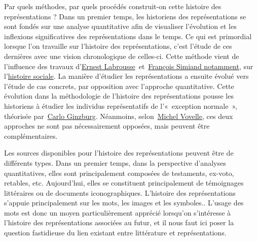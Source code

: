 \documentclass[letterpaper,portrait,12pt]{article}
\begin{document}
\textcolor[rgb]{0.000,0.000,0.000}{	Par quels m\'{e}thodes, par quels proc\'{e}d\'{e}s construit-on cette histoire des repr\'{e}sentations ? Dans un premier temps, les historiens des repr\'{e}sentations se sont fond\'{e}s sur une analyse quantitative afin de visualiser l'\'{e}volution et les inflexions significatives des repr\'{e}sentations dans le temps. Ce qui est primordial lorsque l'on travaille sur l'histoire des repr\'{e}sentations, c'est l'\'{e}tude de ces derni\`{e}res avec une vision chronologique de celles-ci. Cette m\'{e}thode vient de l'influence des travaux d'}\href{https://fr.wikipedia.org/wiki/Ernest_Labrousse}{\textcolor[rgb]{0.000,0.000,0.000}{Ernest Labrousse}}\textcolor[rgb]{0.000,0.000,0.000}{ et }\href{https://fr.wikipedia.org/wiki/François_Simiand}{\textcolor[rgb]{0.000,0.000,0.000}{Fran\c{c}ois Simiand notamment}}\textcolor[rgb]{0.000,0.000,0.000}{, sur l'}\href{https://fr.wikipedia.org/wiki/Histoire_sociale}{\textcolor[rgb]{0.000,0.000,0.000}{histoire sociale}}\textcolor[rgb]{0.000,0.000,0.000}{. La mani\`{e}re d'\'{e}tudier les repr\'{e}sentations a ensuite \'{e}volu\'{e} vers l'\'{e}tude de cas concrets, par opposition avec l'approche quantitative. Cette \'{e}volution dans la m\'{e}thodologie de l'histoire des repr\'{e}sentations pousse les historiens \`{a} \'{e}tudier les individus repr\'{e}sentatifs de l'« exception normale », th\'{e}oris\'{e}e par }\href{https://fr.wikipedia.org/wiki/Carlo_Ginzburg}{\textcolor[rgb]{0.000,0.000,0.000}{Carlo Ginzburg}}\textcolor[rgb]{0.000,0.000,0.000}{. N\'{e}anmoins, selon }\href{https://fr.wikipedia.org/wiki/Michel_Vovelle}{Michel }\href{https://fr.wikipedia.org/wiki/Michel_Vovelle}{Vovelle}\textcolor[rgb]{0.000,0.000,0.000}{, ces deux approches ne sont pas n\'{e}cessairement oppos\'{e}es, mais peuvent \^{e}tre compl\'{e}mentaires. }





	Les sources disponibles pour l'histoire des repr\'{e}sentations peuvent \^{e}tre de diff\'{e}rents types. Dans un premier temps, dans la perspective d'analyses quantitatives, elles sont principalement compos\'{e}es de testaments, ex-voto, retables, etc. Aujourd'hui, elles se constituent principalement de t\'{e}moignages litt\'{e}raires ou de documents iconographiques\hypertarget{cite_ref-24}{}. L'histoire des repr\'{e}sentations s'appuie principalement sur les mots, les images et les symboles.. L'usage des mots est donc un moyen particuli\`{e}rement appr\'{e}ci\'{e} lorsqu'on s'int\'{e}resse \`{a} l'histoire des repr\'{e}sentations associ\'{e}es au futur, et il nous faut ici poser la question fastidieuse du lien existant entre litt\'{e}rature et repr\'{e}sentations.
\end{document}
